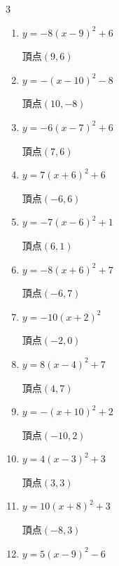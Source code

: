 \begin{multicols}{3}
\begin{enumerate}
        $\displaystyle 頂点\left( 1 , -6 \right)$

  \item $\displaystyle y=-8\left( x-9\right)^{2}+6$

        $\displaystyle 頂点\left( 9 , 6 \right)$

  \item $\displaystyle y=-\left( x-10\right)^{2}-8$

        $\displaystyle 頂点\left( 10 , -8 \right)$

  \item $\displaystyle y=-6\left( x-7\right)^{2}+6$

        $\displaystyle 頂点\left( 7 , 6 \right)$

  \item $\displaystyle y=7\left( x+6\right)^{2}+6$

        $\displaystyle 頂点\left( -6 , 6 \right)$

  \item $\displaystyle y=-7\left( x-6\right)^{2}+1$

        $\displaystyle 頂点\left( 6 , 1 \right)$

  \item $\displaystyle y=-8\left( x+6\right)^{2}+7$

        $\displaystyle 頂点\left( -6 , 7 \right)$

  \item $\displaystyle y=-10\left( x+2\right)^{2}$

        $\displaystyle 頂点\left( -2 , 0 \right)$

  \item $\displaystyle y=8\left( x-4\right)^{2}+7$

        $\displaystyle 頂点\left( 4 , 7 \right)$

  \item $\displaystyle y=-\left( x+10\right)^{2}+2$

        $\displaystyle 頂点\left( -10 , 2 \right)$

  \item $\displaystyle y=4\left( x-3\right)^{2}+3$

        $\displaystyle 頂点\left( 3 , 3 \right)$

  \item $\displaystyle y=10\left( x+8\right)^{2}+3$

        $\displaystyle 頂点\left( -8 , 3 \right)$

  \item $\displaystyle y=5\left( x-9\right)^{2}-6$


\end{enumerate}
\end{multicols}
